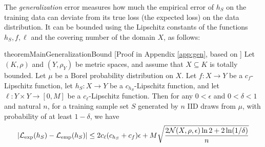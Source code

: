 \documentclass{article}
\begin{document}
The \emph{generalization} error measures how much the empirical error of $h_S$ on the training data can deviate from its true loss (the expected loss) on the data distribution. It can be bounded  using the Lipschitz constants of the functions $h_S,f,\ell$ and the covering number of the domain $X$, as follows:

\begin{restatable}{theorem}{MainGeneralizationBound}
\label{thm:MainGeneralizationBound}[Proof  in Appendix \ref{app:gen}, based on \cite{xu_robustness_2012} ]
Let $(K,\rho)$ and $(Y,\rho_Y)$ be metric spaces, and assume that $X\subseteq K$ is totally bounded. Let $\mu$ be a Borel probability distribution on $X$.  Let $f:X\to Y$ be a $c_f$-Lipschitz function, let $h_S:X\to Y$ be a $c_{h_S}$-Lipschitz function, and let $\ell:Y\times Y\to[0,M]$ be a $c_\ell$-Lipschitz function. Then for any $0<\epsilon$ and $0<\delta<1$ and natural $n$,  for a training sample set $S$ generated by $n$ IID draws from  $\mu$, with probability of at least $ 1-\delta$, we have 
$$|\mathcal{L}_{\mathrm{exp}}(h_S) - \mathcal{L}_{\mathrm{emp}}(h_S)| \le 2c_\ell (c_{h_S}+c_f)\epsilon+M \sqrt{\frac{2\mathcal{N}( X, \rho,\epsilon)\ln 2 + 2 \ln(1/\delta)}{n}}$$
\end{restatable}
\end{document}
